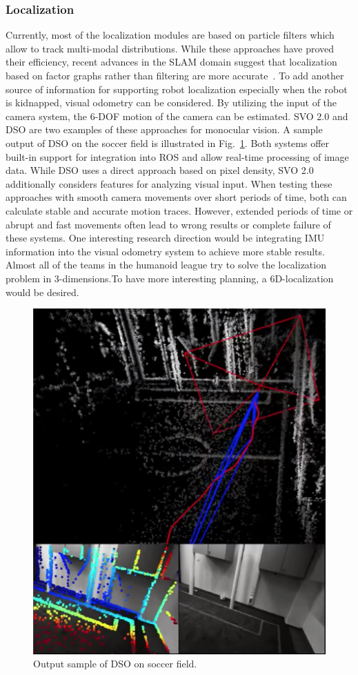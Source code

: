 \documentclass{article}
\begin{document}
\subsubsection{Localization}
Currently, most of the localization modules are based on particle filters which allow to track multi-modal distributions. 
While these approaches have proved their efficiency, recent advances in the SLAM domain suggest that localization based on factor graphs rather than filtering are more accurate~\cite{Strasdat2012}.
To add another source of information for supporting robot localization especially when the robot is kidnapped, visual odometry can be considered.
By utilizing the input of the camera system, the 6-DOF motion of the camera can be estimated. SVO 2.0 \cite{forster2014svo} and DSO \cite{engel2018direct} are two examples of these approaches for monocular vision.
A sample output of DSO on the soccer field is illustrated in Fig.~\ref{FigDSO}.
Both systems offer built-in support for integration into ROS and allow real-time processing of image data. 
While DSO uses a direct approach based on pixel density, SVO 2.0 additionally considers features for analyzing visual input. 
When testing these approaches with smooth camera movements over short periods of time, both can calculate stable and accurate motion traces. 
However, extended periods of time or abrupt and fast movements often lead to wrong results or complete failure of these systems. 
One interesting research direction would be integrating IMU information into the visual odometry system to achieve more stable results.
Almost all of the teams in the humanoid league try to solve the localization problem in 3-dimensions.To have more interesting planning, a 6D-localization would be desired.
\begin{figure}[h]
	\centering
		\includegraphics[width=0.5\linewidth]{dso}\vspace{-1ex}
	\caption{ Output sample of DSO on soccer field.}
	\label{FigDSO}
\end{figure}
\end{document}
